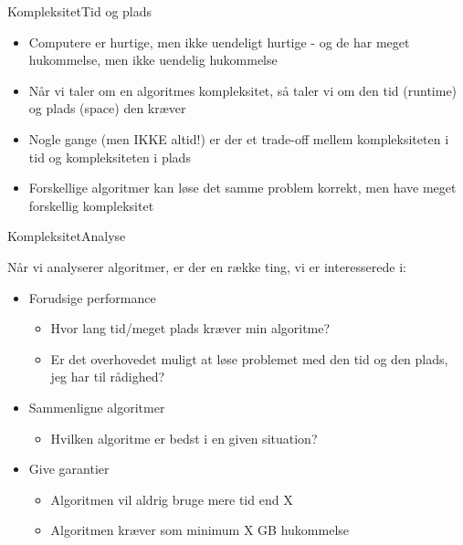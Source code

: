 \documentclass[aspectratio=1610]{beamer}
\begin{document}
\begin{frame}{Kompleksitet}{Tid og plads}
    \begin{itemize}
        \item Computere er hurtige, men ikke uendeligt hurtige - og de har meget
            hukommelse, men ikke uendelig hukommelse
        \item Når vi taler om en algoritmes kompleksitet, så taler vi om den
            \alert{tid} (runtime) og \alert{plads} (space) den kræver
        \item Nogle gange (men IKKE altid!) er der et \alert{trade-off mellem
            kompleksiteten i tid og kompleksiteten i plads}
        \item Forskellige algoritmer kan løse det samme problem korrekt, men
            have meget forskellig kompleksitet
    \end{itemize}
\end{frame}

\begin{frame}{Kompleksitet}{Analyse}

        Når vi analyserer algoritmer, er der en række ting, vi er interesserede
        i:

        \pause
        \begin{itemize}
            \item Forudsige performance
                \begin{itemize}
                    \item Hvor lang tid/meget plads kræver min algoritme?
                    \item Er det overhovedet muligt at løse problemet med den
                        tid og den plads, jeg har til rådighed?
                \end{itemize}
                \pause
            \item Sammenligne algoritmer
                \begin{itemize}
                    \item Hvilken algoritme er bedst i en given situation?
                \end{itemize}
                \pause
            \item Give garantier
                \begin{itemize}
                    \item Algoritmen vil aldrig bruge \alert{mere} tid end X
                    \item Algoritmen kræver \alert{som minimum} X GB hukommelse
                \end{itemize}
        \end{itemize}
    
\end{frame}
\end{document}

